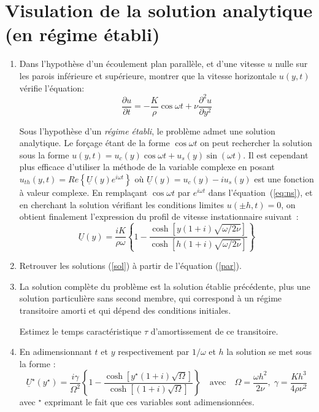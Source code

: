 \documentclass[a4,12pt]{article}
\begin{document}
\section{Visulation de la solution analytique (en régime établi)}
\begin{enumerate}
\item Dans l'hypoth\`ese d'un \'ecoulement plan parall\`ele, et d'une vitesse $u$ nulle sur les 
parois inf\'erieure et sup\'erieure,
 montrer que
la vitesse horizontale $u(y, t)$ v\'erifie l'\'equation:
\begin{equation}
\label{par}
  \frac{\partial u}{\partial t} 
  = 
  - \frac{K}{\rho} \cos \omega t + \nu \frac{\partial^2 u}{\partial y^2}
  \label{eq:ns}
\end{equation}

\noindent
Sous l'hypothèse d'un {\em régime établi}, le problème admet une solution analytique. Le forçage étant de la forme $\cos \omega t $ on peut rechercher la solution sous la forme $u(y,t) = u_c(y) \cos \omega t + u_s(y) \sin(\omega t)$. Il est cependant plus efficace d'utiliser la méthode de la variable complexe en posant $u_{th}(y, t) = Re \left \{ \underline{U}(y) e^{i \omega t} \right \}$ où $\underline{U}(y) = u_c(y) - i u_s(y)$ est une fonction à valeur complexe. En remplaçant $\cos \omega t$ par $e^{i\omega t}$  dans l'\'equation~(\ref{eq:ns}), et en cherchant la solution vérifiant les conditions limites $u(\pm h,t) = 0$, on obtient finalement l'expression du profil de vitesse instationnaire suivant~:
\begin{equation}
\label{sol}
 \underline{U}(y) = \frac{iK}{\rho \omega} \left \{ 
1 - \frac{\cosh [ y ( 1+i) \sqrt{\omega / 2\nu} ]}{\cosh [ 
h ( 1+i) \sqrt{\omega / 2\nu} ]}
\right \}
\end{equation}
\item Retrouver les solutions (\ref{sol}) \`a partir de l'\'equation (\ref{par}).

\item La solution complète du problème est la solution établie précédente,
plus une solution particulière sans second membre, qui correspond à un
régime transitoire amorti et qui dépend des conditions
initiales. 

Estimez le temps caractéristique $\tau$ d'amortissement de ce transitoire.
 

\item En adimensionnant $t$ et $y$ respectivement par $1/\omega$
et $h$ la solution se met sous la forme :
\begin{equation}
\label{soladim}
 \underline{U}^\star(y^\star) = \frac{i\gamma}{\Omega^2} \left \{
1 - \frac{\cosh [ y^\star ( 1+i) \sqrt{\Omega} ]}{\cosh [ 
( 1+i) \sqrt{\Omega} ]} \right \}
\quad
\mbox{avec} \quad
\Omega = \frac{\omega h^2}{2\nu}, \; \gamma = \frac{Kh^3}{4\rho \nu^2}
\end{equation}
\noindent 
avec $^\star$ exprimant le fait que ces variables sont adimensionn\'ees. 


\end{enumerate}
\end{document}
